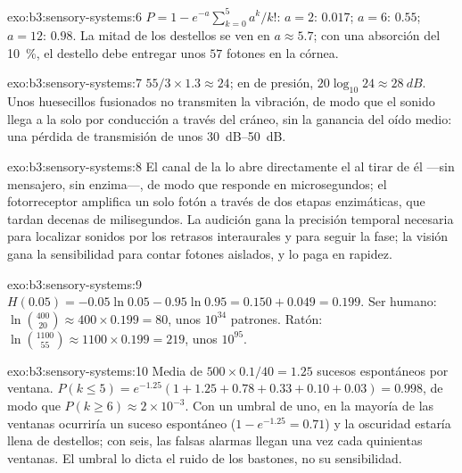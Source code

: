 \begin{solution}{exo:b3:sensory-systems:6}
$P = 1 - e^{-a}\sum_{k=0}^{5}a^{k}/k!$: $a = 2$: $0.017$; $a = 6$:
$0.55$; $a = 12$: $0.98$. La mitad de los destellos se ven en
$a \approx 5.7$; con una absorción del \qty{10}{\%}, el destello debe
entregar unos $57$ fotones en la córnea.
\end{solution}

\begin{solution}{exo:b3:sensory-systems:7}
$55/3\times 1.3 \approx 24$; en  de presión, $20\log_{10}24
\approx \qty{28}{dB}$. Unos huesecillos fusionados no transmiten la
vibración, de modo que el sonido llega a la  solo por conducción
a través del cráneo, sin la ganancia del oído medio: una pérdida de
transmisión de unos \qtyrange{30}{50}{dB}.
\end{solution}

\begin{solution}{exo:b3:sensory-systems:8}
El canal de la  lo abre directamente el  al
tirar de él ---sin mensajero, sin enzima---, de modo que responde en
microsegundos; el fotorreceptor amplifica un solo fotón a través de dos
etapas enzimáticas, que tardan decenas de milisegundos. La audición
gana la precisión temporal necesaria para localizar sonidos por los
retrasos interaurales y para seguir la fase; la visión gana la
sensibilidad para contar fotones aislados, y lo paga en rapidez.
\end{solution}

\begin{solution}{exo:b3:sensory-systems:9}
$H(0.05) = -0.05\ln 0.05 - 0.95\ln 0.95 = 0.150 + 0.049 = 0.199$. Ser
humano: $\ln\binom{400}{20} \approx 400\times 0.199 = 80$, unos
$10^{34}$ patrones. Ratón: $\ln\binom{1100}{55} \approx 1100\times 0.199
= 219$, unos $10^{95}$.
\end{solution}

\begin{solution}{exo:b3:sensory-systems:10}
Media de $500\times 0.1/40 = 1.25$ sucesos espontáneos por ventana. $P(k
\le 5) = e^{-1.25}(1 + 1.25 + 0.78 + 0.33 + 0.10 + 0.03) = 0.998$, de
modo que $P(k \ge 6) \approx 2\times 10^{-3}$. Con un umbral de uno, en
la mayoría de las ventanas ocurriría un suceso espontáneo
($1 - e^{-1.25} = 0.71$) y la oscuridad estaría llena de destellos; con
seis, las falsas alarmas llegan una vez cada quinientas ventanas. El
umbral lo dicta el ruido de los bastones, no su sensibilidad.
\end{solution}

